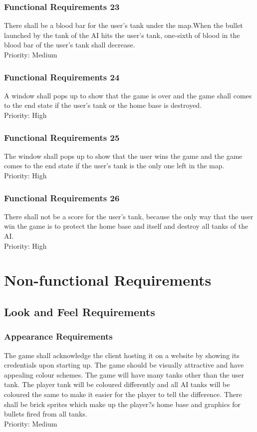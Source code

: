 \documentclass[12pt, titlepage]{article}
\begin{document}
\subsubsection{Functional Requirements 23} There shall be a blood bar for the user's tank under the map.When 
the bullet launched by the tank of the AI hits the user's tank, one-sixth of blood in the blood bar of the user's tank shall 
decrease.\\Priority: Medium
\subsubsection{Functional Requirements 24} A window shall pops up to show that the game is over and the game shall
 comes to the end state if the user's tank or the home base is destroyed.\\Priority: High
\subsubsection{Functional Requirements 25} The window shall pops up to show that the user wins the game and the game
 comes to the end state if the user's tank is the only one left in the map.\\Priority: High
 \subsubsection{Functional Requirements 26} There shall not be a score for the user's tank, because the only way that
 the user win the game is to protect the home base and itself and destroy all tanks of the AI. \\Priority: High
\section{Non-functional Requirements}
\subsection{Look and Feel Requirements}
\subsubsection{Appearance Requirements}
The game shall acknowledge the client hosting it on a website by showing its
credentials upon starting up. The game should be visually attractive and have
appealing colour schemes. The game will have many tanks other than the user
tank. The player tank will be coloured differently and all AI tanks will be
coloured the same to make it easier for the player to tell the difference. There
shall be brick sprites which make up the player?s home base and graphics for
bullets fired from all tanks.\\Priority: Medium
\end{document}
